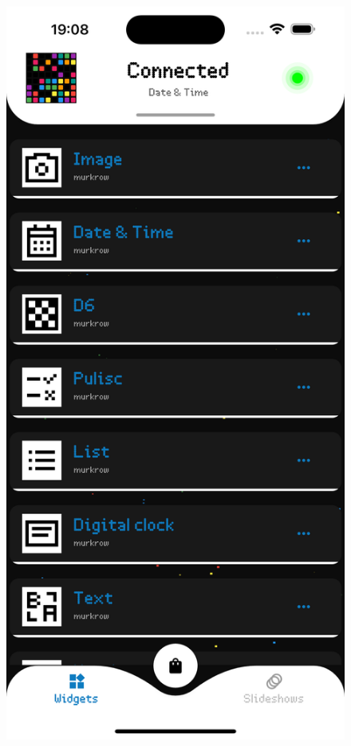 \begin{figure}[h]
    \centering
    \begin{minipage}[b]{0.24\textwidth}
        \centering
        \includegraphics[width=\textwidth]{tesi/img/client_demo/installed_widgets.png}

\end{minipage}
\end{figure}
